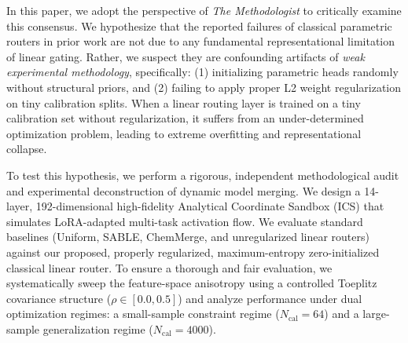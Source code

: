 In this paper, we adopt the perspective of \emph{The Methodologist} to critically examine this consensus. We hypothesize that the reported failures of classical parametric routers in prior work are not due to any fundamental representational limitation of linear gating. Rather, we suspect they are confounding artifacts of \emph{weak experimental methodology}, specifically: (1) initializing parametric heads randomly without structural priors, and (2) failing to apply proper L2 weight regularization on tiny calibration splits. When a linear routing layer is trained on a tiny calibration set without regularization, it suffers from an under-determined optimization problem, leading to extreme overfitting and representational collapse.

To test this hypothesis, we perform a rigorous, independent methodological audit and experimental deconstruction of dynamic model merging. We design a 14-layer, 192-dimensional high-fidelity Analytical Coordinate Sandbox (ICS) that simulates LoRA-adapted multi-task activation flow. We evaluate standard baselines (Uniform, SABLE, ChemMerge, and unregularized linear routers) against our proposed, properly regularized, maximum-entropy zero-initialized classical linear router. To ensure a thorough and fair evaluation, we systematically sweep the feature-space anisotropy using a controlled Toeplitz covariance structure ($\rho \in [0.0, 0.5]$) and analyze performance under dual optimization regimes: a small-sample constraint regime ($N_{\text{cal}} = 64$) and a large-sample generalization regime ($N_{\text{cal}} = 4000$).

